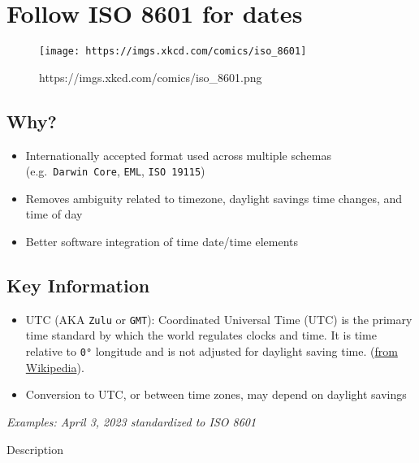 \documentclass[
  oneside]{book}
\providecommand{\tightlist}{%
  \setlength{\itemsep}{0pt}\setlength{\parskip}{0pt}}
\begin{document}
\hypertarget{follow-iso-8601-for-dates}{%
\section{Follow ISO 8601 for dates}\label{follow-iso-8601-for-dates}}

\begin{figure}

{\centering \texttt{[image: https://imgs.xkcd.com/comics/iso\_8601]} 

}

\caption{https://imgs.xkcd.com/comics/iso_8601.png}\label{fig:xkcd1}
\end{figure}

\hypertarget{why-2}{%
\subsection{Why?}\label{why-2}}

\begin{itemize}
\tightlist
\item
  Internationally accepted format used across multiple schemas (e.g.~\texttt{Darwin\ Core}, \texttt{EML}, \texttt{ISO\ 19115})
\item
  Removes ambiguity related to timezone, daylight savings time changes, and time of day
\item
  Better software integration of time date/time elements
\end{itemize}

\hypertarget{key-information-2}{%
\subsection{Key Information}\label{key-information-2}}

\begin{itemize}
\tightlist
\item
  UTC (AKA \texttt{Zulu} or \texttt{GMT}): Coordinated Universal Time (UTC) is the primary time standard by which the world regulates clocks and time. It is time relative to \texttt{0°} longitude and is not adjusted for daylight saving time. (\href{https://en.wikipedia.org/wiki/ISO_8601}{from Wikipedia}).
\item
  Conversion to UTC, or between time zones, may depend on daylight savings
\end{itemize}

\emph{Examples: April 3, 2023 standardized to ISO 8601}

Description
\end{document}
